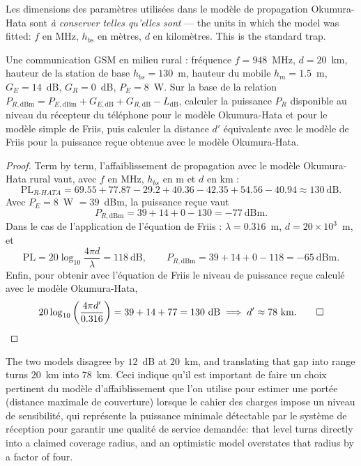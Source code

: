 \begin{remark}
  Les dimensions des paramètres utilisées dans le modèle de propagation
  Okumura-Hata sont \emph{à conserver telles qu'elles sont} --- the units in
  which the model was fitted: $f$ en MHz, $h_{bs}$ en mètres, $d$ en
  kilomètres. This is the standard trap.
\end{remark}

\begin{problem}
  Une communication GSM en milieu rural : fréquence $f = 948$~MHz,
  $d = 20$~km, hauteur de la station de base $h_{bs} = 130$~m, hauteur du
  mobile $h_m = 1.5$~m, $G_E = 14$~dB, $G_R = 0$~dB, $P_E = 8$~W. Sur la base
  de la relation
  $P_{R,\mathrm{dBm}} = P_{E,\mathrm{dBm}} + G_{E,\mathrm{dB}} + G_{R,\mathrm{dB}} - L_{\mathrm{dB}}$,
  calculer la puissance $P_R$ disponible au niveau du récepteur du téléphone
  pour le modèle Okumura-Hata et pour le modèle simple de Friis, puis calculer
  la distance $d'$ équivalente avec le modèle de Friis pour la puissance reçue
  obtenue avec le modèle Okumura-Hata.
\end{problem}

\begin{proof}
  Term by term, l'affaiblissement de propagation avec le modèle Okumura-Hata
  rural vaut, avec $f$ en MHz, $h_{bs}$ en m et $d$ en km :
  \[ \mathrm{PL}_{R\text{-}HATA} = 69.55 + 77.87 - 29.2 + 40.36 - 42.35 + 54.56 - 40.94
     \approx 130\ \mathrm{dB}. \]
  Avec $P_E = 8$~W $= 39$~dBm, la puissance reçue vaut
  \[ P_{R,\mathrm{dBm}} = 39 + 14 + 0 - 130 = -77\ \mathrm{dBm}. \]
  Dans le cas de l'application de l'équation de Friis : $\lambda = 0.316$~m,
  $d = 20 \times 10^{3}$~m, et
  \[ \mathrm{PL} = 20 \log_{10}\frac{4 \pi d}{\lambda} = 118\ \mathrm{dB},
     \qquad P_{R,\mathrm{dBm}} = 39 + 14 + 0 - 118 = -65\ \mathrm{dBm}. \]
  Enfin, pour obtenir avec l'équation de Friis le niveau de puissance reçue
  calculé avec le modèle Okumura-Hata,
  \[ 20 \log_{10}\left(\frac{4 \pi d'}{0.316}\right) = 39 + 14 + 77 = 130\ \mathrm{dB}
     \;\Longrightarrow\; d' \approx 78\ \mathrm{km}. \qed \]
\end{proof}

\begin{conclusion}
  The two models disagree by $12$~dB at $20$~km, and translating that gap into
  range turns $20$~km into $78$~km. Ceci indique qu'il est important de faire
  un choix pertinent du modèle d'affaiblissement que l'on utilise pour estimer une
  portée (distance maximale de couverture) lorsque le cahier des charges impose
  un niveau de sensibilité, qui représente la puissance minimale détectable par
  le système de réception pour garantir une qualité de service demandée: that
  level turns directly into a claimed coverage radius, and an optimistic model
  overstates that radius by a factor of four.
\end{conclusion}

